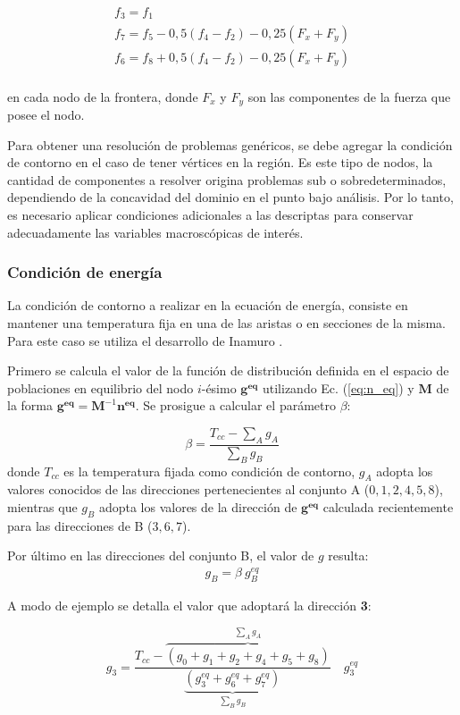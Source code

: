 \begin{equation}
\begin{array}{c}
f_{3} = f_{1}\\
f_{7} = f_{5} - 0,5 (f_{4} - f_{2}) - 0,25 (F_{x} + F_{y})\\
f_{6} = f_{8} + 0,5 (f_{4} - f_{2}) - 0,25 (F_{x} + F_{y})\\
\end{array}
\end{equation}

en cada nodo de la frontera, donde $F_{x}$ y  $F_{y}$ son las componentes de la fuerza que posee el nodo. 

Para obtener una resolución de problemas genéricos, se debe agregar la condición de contorno en el caso de tener vértices en la región. Es este tipo de nodos, la cantidad de componentes a resolver origina problemas sub o sobredeterminados, dependiendo de la concavidad del dominio en el punto bajo análisis. Por lo tanto, es necesario aplicar condiciones adicionales a las descriptas para conservar adecuadamente las variables macroscópicas de interés.

\subsubsection{Condición de energía}

La condición de contorno a realizar en la ecuación de energía, consiste en mantener una temperatura fija en una de las aristas o en secciones de la misma. Para este caso se utiliza el desarrollo de Inamuro \cite{inamuro2002lattice}.

Primero se calcula el valor de la función de distribución definida en el espacio de poblaciones en equilibrio del nodo $i$-ésimo $\mathbf{g^{eq}}$ utilizando Ec. (\ref{eq:n_eq}) y $\mathbf{M}$ de la forma $\mathbf{g^{eq}} = \mathbf{M}^{-1} \mathbf{n^{eq}}$. Se prosigue a calcular el parámetro $\beta$:

\begin{equation}
\beta = \frac{T_{cc} - \sum_{A} g_{A}}{\sum_{B} g_{B}}
\label{eq:beta}
\end{equation}
donde $T_{cc}$ es la temperatura fijada como condición de contorno, $g_{A}$ adopta los valores conocidos de las direcciones pertenecientes al conjunto A ($0, 1, 2, 4, 5, 8 $), mientras que $g_{B}$ adopta los valores de la dirección de $\mathbf{g^{eq}}$ calculada recientemente para las direcciones de B ($3, 6, 7$).

Por último en las direcciones del conjunto B, el valor de $g$ resulta:
\begin{align}
	g_{B} = \beta \> g^{eq}_{B} 
\end{align}

A modo de ejemplo se detalla el valor que adoptará la dirección \textbf{3}:

\begin{equation}
	g_{3} = \frac{T_{cc} - \overbrace{\left( g_{0} + g_{1} +g_{2} + g_{4} + g_{5} + g_{8} \right)}^{\sum_{A} g_{A}} }{\underbrace{\left( g^{eq}_{3} + g^{eq}_{6} + g^{eq}_{7} \right)}_{\sum_{B} g_{B} }} \quad g^{eq}_{3}
\end{equation}


